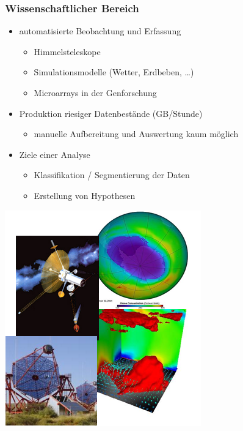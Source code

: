 \begin{frame}
\frametitle{Wissenschaftlicher Bereich}

\begin{minipage}[c]{7cm}
\begin{itemize}
\item automatisierte Beobachtung und Erfassung
\begin{itemize}
\item Himmelsteleskope
\item Simulationsmodelle (Wetter, Erdbeben, \dots)
\item Microarrays in der Genforschung
\end{itemize}
\item Produktion riesiger Datenbestände (GB/Stunde)
\begin{itemize}
\item manuelle Aufbereitung und Auswertung kaum möglich
\end{itemize}
\item Ziele einer Analyse
\begin{itemize}
\item Klassifikation / Segmentierung der Daten
\item Erstellung von Hypothesen
\end{itemize}
\end{itemize}
\end{minipage}\quad
\begin{minipage}[c]{3cm}
\includegraphics[scale=.3]{fig1/wiss-anwendung.png}
\end{minipage}

\end{frame}

